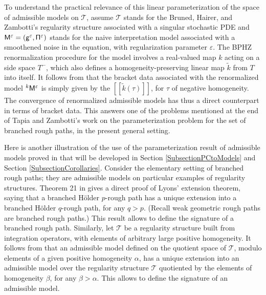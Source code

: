 \documentclass[10pt]{amsart}
\theoremstyle{plain}
\theoremstyle{definition}
\newcommand{\Brac}[1]{[\![#1]\!]}
\let\epsilon\varepsilon
\begin{document}
To understand the practical relevance of this linear parameterization of the space of admissible models on $\mathscr{T}$, assume $\mathscr{T}$ stands for the Bruned, Hairer, and Zambotti's regularity structure \cite{BHZ} associated with a singular stochastic PDE and ${\sf M}^\epsilon = ({\sf g}^\epsilon,{\sf \Pi}^\epsilon)$ stands for the naive interpretation model associated with a smoothened noise in the equation, with regularization parameter $\epsilon$. The BPHZ renormalization procedure for the model involves a real-valued map $k$ acting on a side space $T^-$, which also defines a homogeneity-preserving linear map $\widetilde{k}$ from $T$ into itself. It follows from \cite[Th.\,21]{BH} that the bracket data associated with the renormalized model $^k{{\sf M}^\epsilon}$ is simply given by the $\Brac{\widetilde{k}(\tau)}$, for $\tau$ of negative homogeneity. The convergence of renormalized admissible models has thus a direct counterpart in terms of bracket data. This answers one of the problems mentioned at the end of Tapia and Zambotti's work \cite{TZ18} on the parameterization problem for the set of branched rough paths, in the present general setting.

Here is another illustration of the use of the parameterization result of admissible models proved in \cite{BH} that will be developed in Section \ref{SubsectionPCtoModels} and Section \ref{SubsectionCorollaries}. Consider the elementary setting of branched rough paths; they are admissible models on particular examples of regularity structures. Theorem 21 in \cite{BH} gives a direct proof of Lyons' extension theorem, saying that a branched Hölder $p$-rough path has a unique extension into a branched Hölder $q$-rough path, for any $q>p$. (Recall weak geometric rough paths are branched rough paths.) This result allows to define the signature of a branched rough path. Similarly, let $\mathscr{T}$ be a regularity structure built from integration operators, with elements of arbitrary large positive homogeneity. It follows from \hbox{\cite[Th.\,21]{BH}} that an admissible model defined on the quotient space of $\mathscr{T}$, modulo elements of a given positive homogeneity $\alpha$, has a unique extension into an admissible model over the regularity structure $\mathscr{T}$ quotiented by the elements of homogeneity $\beta$, for any $\beta>\alpha$. This allows to define the signature of an admissible model.
\end{document}
